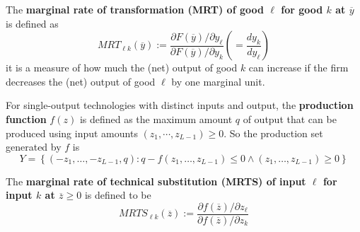 \documentclass{report}
\begin{document}
	 		\begin{definition}
	 			The \textbf{marginal rate of transformation (MRT) of good $\ell$ for good $k$ at $\overline{y}$} is defined as 
	 			\begin{equation}
	 				M R T_{\ell k}(\overline{y}) := \frac{\partial F(\overline{y}) / \partial y_{\ell}}{\partial F(\overline{y}) / \partial y_{k}} \left ( = \frac{dy_k}{dy_\ell} \right )
	 			\end{equation}
	 			it is a measure of how much the (net) output of good $k$ can increase if the firm decreases the (net) output of good $\ell$ by one marginal unit.
	 		\end{definition}
	 		
	 		\begin{definition}
	 			For single-output technologies with distinct inputs and output, the \textbf{production function} $f(z)$ is defined as the maximum amount $q$ of output that can be produced using input amounts $(z_1, \cdots, z_{L-1}) \geq 0$. So the production set generated by $f$ is 
	 			\begin{equation}
	 				Y=\left\{\left(-z_{1}, \ldots,-z_{L-1}, q\right) : q-f\left(z_{1}, \ldots, z_{L-1}\right) \leq 0 \land \left(z_{1}, \ldots, z_{L-1}\right) \geq 0\right\}
	 			\end{equation}
	 		\end{definition}
	 		
	 		\begin{definition}
	 			The \textbf{marginal rate of technical substitution (MRTS) of input $\ell$ for input $k$ at $\overline{z} \geq 0$} is defined to be
	 			\begin{equation}
	 				MRTS_{\ell k}(\overline{z}) := \frac{\partial f(\overline{z}) / \partial z_{\ell}}{\partial f(\overline{z}) / \partial z_{k}}
	 			\end{equation}
	 		\end{definition}
	 		
\end{document}
